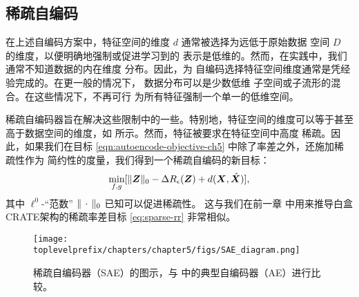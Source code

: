 \documentclass[../../book-main_zh.tex]{subfiles}
\begin{document}
\subsection{稀疏自编码}
在上述自编码方案中，特征空间的维度
$d$ 通常被选择为远低于原始数据
空间 $D$ 的维度，以便明确地强制或促进学习到的
表示是低维的。然而，在实践中，我们
通常不知道数据的内在维度
分布。因此，为
自编码选择特征空间维度通常是凭经验完成的。在更一般的情况下，
数据分布可以是少数低维
子空间或子流形的混合。在这些情况下，不再可行
为所有特征强制一个单一的低维空间。

稀疏自编码器旨在解决这些限制中的一些。特别地，特征空间的维度可以等于甚至
高于数据空间的维度，如
 所示。然而，特征被要求在特征空间中高度
稀疏。因此，如果我们在目标
\eqref{eqn:autoencode-objective-ch5} 中除了率差之外，还施加稀疏性作为
简约性的度量，我们得到一个稀疏自编码的新目标：
\begin{equation}
  \min_{f, g}
  [\|\bm{Z}\|_0 - \Delta R_{\epsilon}(\bm{Z}) + d(\bm{X}, \hat {\bm{X}})],
  \label{eqn:autoencode-sparse}
\end{equation}
其中 $\ell^0$-“范数” $\|\,\cdot\,\|_0$ 已知可以促进稀疏性。
这与我们在前一章  中用来推导白盒CRATE架构的稀疏率差目标
\eqref{eq:sparse-rr} 非常相似。

\begin{figure}
  \centering
  \texttt{[image: \\toplevelprefix/chapters/chapter5/figs/SAE\_diagram.png]}
  \caption{稀疏自编码器（SAE）的图示，与
   中的典型自编码器（AE）进行比较。}
  \label{fig:SAE}
\end{figure}

\end{document}
